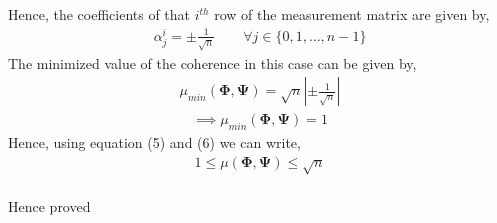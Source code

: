 \documentclass[12pt]{article}
\begin{document}
Hence, the coefficients of that $i^{th}$ row of the measurement matrix are given by,
\begin{gather*}
    \alpha_j^i = \pm \frac{1}{\sqrt{n}} \quad \quad \forall j \in \{0,1,\dots,n-1\}
\end{gather*}
The minimized value of the coherence in this case can be given by,
\begin{gather*}
    \mu_{min}(\boldsymbol{\Phi},\boldsymbol{\Psi}) = \sqrt{n} \left | \pm \frac{1}{\sqrt{n}} \right | 
\end{gather*}
\begin{gather}
\implies \mu_{min}(\boldsymbol{\Phi},\boldsymbol{\Psi}) = 1
\end{gather}
Hence, using equation (5) and (6) we can write,
\begin{gather*}
   1 \leq \mu(\boldsymbol{\Phi},\boldsymbol{\Psi}) \leq \sqrt{n}
\end{gather*}
\\
Hence proved
\end{document}
